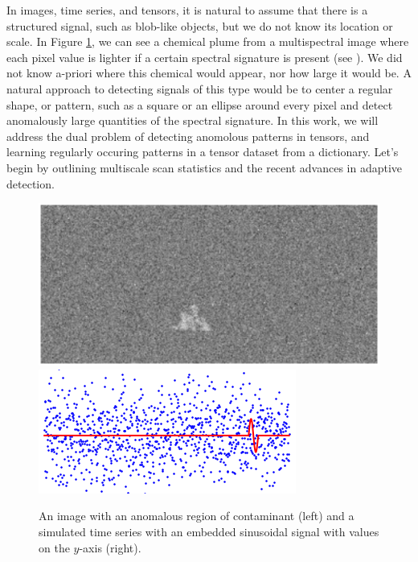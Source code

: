 In images, time series, and tensors, it is natural to assume that there is a structured signal, such as blob-like objects, but we do not know its location or scale.
In Figure \ref{fig:scan}, we can see a chemical plume from a multispectral image where each pixel value is lighter if a certain spectral signature is present (see \cite{manolakis2002detection}).
We did not know a-priori where this chemical would appear, nor how large it would be.
A natural approach to detecting signals of this type would be to center a regular shape, or pattern, such as a square or an ellipse around every pixel and detect anomalously large quantities of the spectral signature.
In this work, we will address the dual problem of detecting anomolous patterns in tensors, and learning regularly occuring patterns in a tensor dataset from a dictionary. 
Let's begin by outlining multiscale scan statistics and the recent advances in adaptive detection.

\begin{figure}[ht]
    \centering
    \includegraphics[width=.45\textwidth]{grey_2.eps}\hspace{.05\textwidth}
    \includegraphics[width=.45\textwidth]{sineNoiseSig.png}
    \caption{An image with an anomalous region of contaminant (left) and a simulated time series with an embedded sinusoidal signal with values on the $y$-axis (right).}
    \label{fig:scan}
\end{figure}

